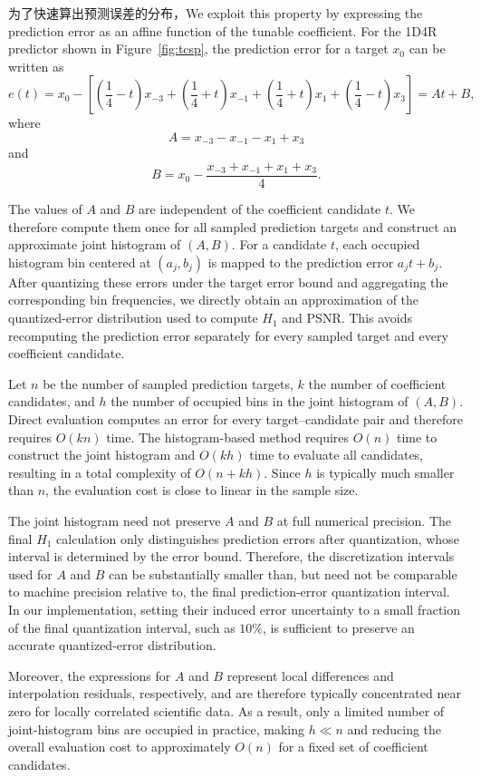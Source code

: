 为了快速算出预测误差的分布，We exploit this property by expressing the prediction error as an affine function of the tunable coefficient. For the 1D4R predictor shown in Figure~\ref{fig:tcsp}, the prediction error for a target $x_0$ can be written as
\begin{equation}
e(t)=x_0-\left[\left(\frac{1}{4}-t\right)x_{-3}
+\left(\frac{1}{4}+t\right)x_{-1}
+\left(\frac{1}{4}+t\right)x_1
+\left(\frac{1}{4}-t\right)x_3\right]
=At+B,
\end{equation}
where
\begin{equation}
A=x_{-3}-x_{-1}-x_1+x_3
\end{equation}
and
\begin{equation}
B=x_0-\frac{x_{-3}+x_{-1}+x_1+x_3}{4}.
\end{equation}

The values of $A$ and $B$ are independent of the coefficient candidate $t$. We therefore compute them once for all sampled prediction targets and construct an approximate joint histogram of $(A,B)$. For a candidate $t$, each occupied histogram bin centered at $(a_j,b_j)$ is mapped to the prediction error $a_jt+b_j$. After quantizing these errors under the target error bound and aggregating the corresponding bin frequencies, we directly obtain an approximation of the quantized-error distribution used to compute $H_1$ and PSNR. This avoids recomputing the prediction error separately for every sampled target and every coefficient candidate.

Let $n$ be the number of sampled prediction targets, $k$ the number of coefficient candidates, and $h$ the number of occupied bins in the joint histogram of $(A,B)$. Direct evaluation computes an error for every target--candidate pair and therefore requires $O(kn)$ time. The histogram-based method requires $O(n)$ time to construct the joint histogram and $O(kh)$ time to evaluate all candidates, resulting in a total complexity of $O(n+kh)$. Since $h$ is typically much smaller than $n$, the evaluation cost is close to linear in the sample size.

The joint histogram need not preserve $A$ and $B$ at full numerical precision. The final $H_1$ calculation only distinguishes prediction errors after quantization, whose interval is determined by the error bound. Therefore, the discretization intervals used for $A$ and $B$ can be substantially smaller than, but need not be comparable to machine precision relative to, the final prediction-error quantization interval. In our implementation, setting their induced error uncertainty to a small fraction of the final quantization interval, such as $10\%$, is sufficient to preserve an accurate quantized-error distribution.

Moreover, the expressions for $A$ and $B$ represent local differences and interpolation residuals, respectively, and are therefore typically concentrated near zero for locally correlated scientific data. As a result, only a limited number of joint-histogram bins are occupied in practice, making $h\ll n$ and reducing the overall evaluation cost to approximately $O(n)$ for a fixed set of coefficient candidates.